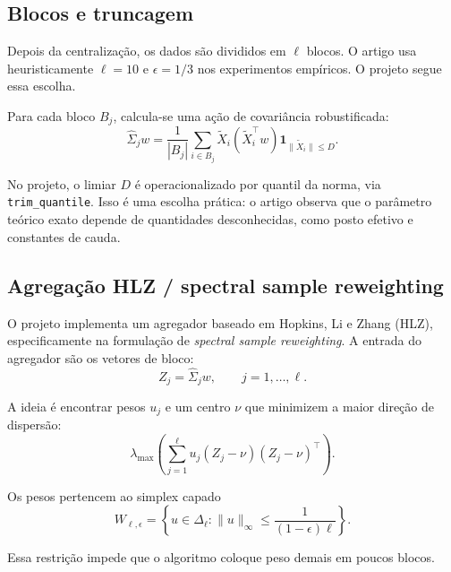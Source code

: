 \documentclass[12pt,a4paper]{article}
\begin{document}
\subsection{Blocos e truncagem}

Depois da centralização, os dados são divididos em $\ell$ blocos. O artigo usa
heuristicamente $\ell=10$ e $\epsilon=1/3$ nos experimentos empíricos. O projeto segue essa
escolha.

Para cada bloco $B_j$, calcula-se uma ação de covariância robustificada:
\begin{equation}
  \widehat\Sigma_j w
  =
  \frac{1}{|B_j|}
  \sum_{i\in B_j}
  \widetilde X_i(\widetilde X_i^\top w)
  \mathbf{1}_{\|\widetilde X_i\|\le D}.
  \label{eq:block_action}
\end{equation}

No projeto, o limiar $D$ é operacionalizado por quantil da norma, via \texttt{trim\_quantile}.
Isso é uma escolha prática: o artigo observa que o parâmetro teórico exato depende de
quantidades desconhecidas, como posto efetivo e constantes de cauda.

\subsection{Agregação HLZ / spectral sample reweighting}

O projeto implementa um agregador baseado em Hopkins, Li e Zhang (HLZ), especificamente
na formulação de \emph{spectral sample reweighting}. A entrada do agregador são os vetores
de bloco:
\begin{equation}
  Z_j = \widehat\Sigma_j w,
  \qquad j=1,\dots,\ell.
\end{equation}

A ideia é encontrar pesos $u_j$ e um centro $\nu$ que minimizem a maior direção de
dispersão:
\begin{equation}
  \lambda_{\max}
  \left(
    \sum_{j=1}^{\ell}
    u_j (Z_j-\nu)(Z_j-\nu)^\top
  \right).
  \label{eq:spectral_center}
\end{equation}

Os pesos pertencem ao simplex capado
\begin{equation}
  W_{\ell,\epsilon}
  =
  \left\{
    u\in\Delta_\ell:
    \|u\|_\infty \le \frac{1}{(1-\epsilon)\ell}
  \right\}.
  \label{eq:capped_simplex}
\end{equation}

Essa restrição impede que o algoritmo coloque peso demais em poucos blocos.
\end{document}
